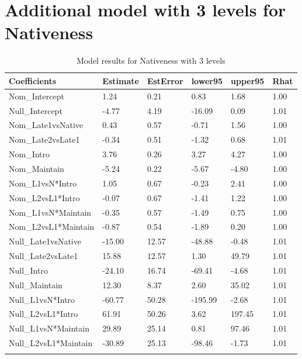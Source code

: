\documentclass[review]{elsarticle} %
\begin{document}
\clearpage

\hypertarget{additional-model-with-3-levels-for-nativeness}{%
\section{Additional model with 3 levels for
Nativeness}\label{additional-model-with-3-levels-for-nativeness}}

\label{section:d}

\begin{table}[hbt!]

\begin{center}
\begin{threeparttable}

\caption{\label{tab:unnamed-chunk-5}Model results for Nativeness with 3 levels}

\small{

\begin{tabular}{llllll}
\toprule
Coefficients & \multicolumn{1}{c}{Estimate} & \multicolumn{1}{c}{EstError} & \multicolumn{1}{c}{lower95} & \multicolumn{1}{c}{upper95} & \multicolumn{1}{c}{Rhat}\\
\midrule
Nom\_Intercept & 1.24 & 0.21 & 0.83 & 1.68 & 1.00\\
Null\_Intercept & -4.77 & 4.19 & -16.09 & 0.09 & 1.01\\
Nom\_Late1vsNative & 0.43 & 0.57 & -0.71 & 1.56 & 1.00\\
Nom\_Late2vsLate1 & -0.34 & 0.51 & -1.32 & 0.68 & 1.01\\
Nom\_Intro & 3.76 & 0.26 & 3.27 & 4.27 & 1.00\\
Nom\_Maintain & -5.24 & 0.22 & -5.67 & -4.80 & 1.00\\
Nom\_L1vsN*Intro & 1.05 & 0.67 & -0.23 & 2.41 & 1.00\\
Nom\_L2vsL1*Intro & -0.07 & 0.67 & -1.41 & 1.22 & 1.00\\
Nom\_L1vsN*Maintain & -0.35 & 0.57 & -1.49 & 0.75 & 1.00\\
Nom\_L2vsL1*Maintain & -0.87 & 0.54 & -1.89 & 0.20 & 1.00\\
Null\_Late1vsNative & -15.00 & 12.57 & -48.88 & -0.48 & 1.01\\
Null\_Late2vsLate1 & 15.88 & 12.57 & 1.30 & 49.79 & 1.01\\
Null\_Intro & -24.10 & 16.74 & -69.41 & -4.68 & 1.01\\
Null\_Maintain & 12.30 & 8.37 & 2.60 & 35.02 & 1.01\\
Null\_L1vsN*Intro & -60.77 & 50.28 & -195.99 & -2.68 & 1.01\\
Null\_L2vsL1*Intro & 61.91 & 50.26 & 3.62 & 197.45 & 1.01\\
Null\_L1vsN*Maintain & 29.89 & 25.14 & 0.81 & 97.46 & 1.01\\
Null\_L2vsL1*Maintain & -30.89 & 25.13 & -98.46 & -1.73 & 1.01\\
\bottomrule
\addlinespace
\end{tabular}

}
\end{threeparttable}
\end{center}
\end{table}
\end{document}
